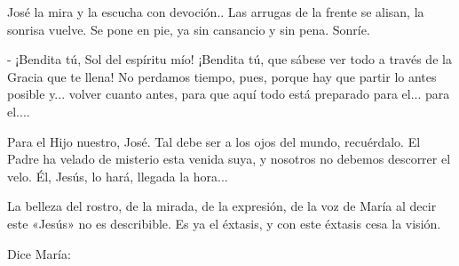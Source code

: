 \documentclass[12pt]{book} %
\begin{document}
José la mira y la escucha con devoción.. Las arrugas de la frente se alisan, la sonrisa vuelve. Se pone en pie, ya sin cansancio y sin pena. Sonríe. 

- ¡Bendita tú, Sol del espíritu mío! ¡Bendita tú, que sábese ver todo a través de la Gracia que te llena! No perdamos tiempo, pues, porque hay que partir lo antes posible y... volver cuanto antes, para que aquí todo está preparado para el... para el.... 

Para el Hijo nuestro, José. Tal debe ser a los ojos del mundo, recuérdalo. El Padre ha velado de misterio esta venida suya, y nosotros no debemos descorrer el velo. Él, Jesús, lo hará, llegada la hora... 

La belleza del rostro, de la mirada, de la expresión, de la voz de María al decir este «Jesús» no es describible. Es ya el éxtasis, y con este éxtasis cesa la visión. 

Dice María: 
\end{document}
